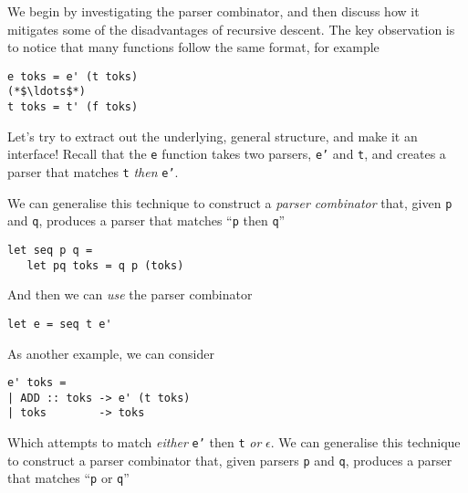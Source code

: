 We begin by investigating the parser combinator, and then discuss how it mitigates some of the disadvantages of recursive descent. The key observation is to notice that many functions follow the same format, for example

\begin{verbatim}
e toks = e' (t toks)
(*$\ldots$*)
t toks = t' (f toks)
\end{verbatim}

Let's try to extract out the underlying, general structure, and make it an interface! Recall that the \texttt{e} function takes two parsers, \texttt{e'} and \texttt{t}, and creates a parser that matches \texttt{t} \textit{then} \texttt{e'}.

We can generalise this technique to construct a \textit{parser combinator} that, given \texttt{p} and \texttt{q}, produces a parser that matches ``\texttt{p} then \texttt{q}''

\begin{verbatim}
let seq p q = 
   let pq toks = q p (toks)
\end{verbatim}
And then we can \textit{use} the parser combinator 
\begin{verbatim}
let e = seq t e'
\end{verbatim}
As another example, we can consider
\begin{verbatim}
e' toks =
| ADD :: toks -> e' (t toks)
| toks        -> toks
\end{verbatim}
Which attempts to match \textit{either} \texttt{e'} then \texttt{t} \textit{or} $\epsilon$. We can generalise this technique to construct a parser combinator that, given parsers \texttt{p} and \texttt{q}, produces a parser that matches ``\texttt{p} or \texttt{q}''

